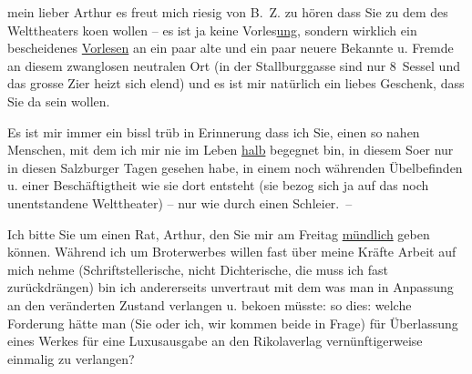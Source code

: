 \pstart{}mein lieber Arthur\pend\vspace{0.5em}
\pstart
           es freut mich riesig von B. Z. zu hören dass
               Sie zu dem \label{K_L02375-1v}\label{K_L02375-1} des Welttheaters ko{\geminationm}en
               wollen – es ist ja keine Vorles\uline{ung}, sondern wirklich
               ein bescheidenes \uline{Vorlesen} an ein paar alte und ein
               paar neuere Bekannte u. Fremde an diesem zwanglosen neutralen Ort (in der Stallburggasse sind nur 8 Sessel und das {\pb}grosse Zi{\geminationm}er heizt sich elend) und es ist mir natürlich ein
               liebes Geschenk, dass Sie da sein wollen.\pend
           
\pstart
           Es ist mir immer ein bissl trüb in Erinnerung dass ich Sie, einen so nahen Menschen,
               mit dem ich mir nie im Leben \uline{halb} begegnet bin, in
               diesem So{\geminationm}er nur in diesen Salzburger Tagen gesehen habe, in einem noch {\pb}währenden Übelbefinden u. einer
               Beschäftigtheit wie sie dort entsteht (sie bezog sich ja auf das noch unentstandene
               Welttheater) – nur wie durch einen Schleier. –\pend
           
\pstart
           Ich bitte Sie um einen Rat, Arthur, den Sie mir am Freitag{ }\uline{mündlich} geben können. Während ich um Broterwerbes
               willen {\pb}fast über meine Kräfte
               Arbeit auf mich nehme (Schriftstellerische, nicht Dichterische, die muss ich fast
               zurückdrängen) bin ich andererseits unvertraut mit dem was man in Anpassung an den
               veränderten Zustand verlangen u. beko{\geminationm}en müsste: so
               dies: welche Forderung hätte man (Sie oder ich, wir kommen beide in Frage) für
               Überlassung eines Werkes für eine Luxusausgabe an den Rikolaverlag vernünftigerweise einmalig zu verlangen?\pend
           
